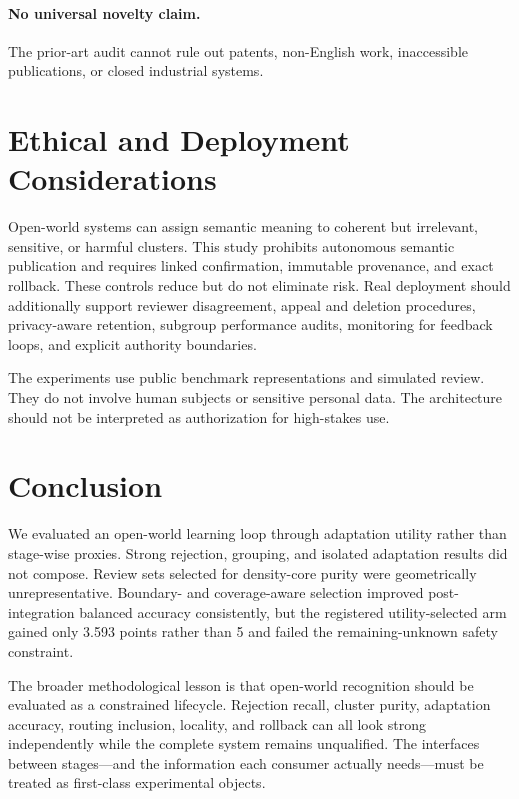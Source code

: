 \documentclass[10pt]{article}
\begin{document}
\paragraph{No universal novelty claim.}
The prior-art audit cannot rule out patents, non-English work, inaccessible
publications, or closed industrial systems.

\section{Ethical and Deployment Considerations}

Open-world systems can assign semantic meaning to coherent but irrelevant,
sensitive, or harmful clusters. This study prohibits autonomous semantic
publication and requires linked confirmation, immutable provenance, and exact
rollback. These controls reduce but do not eliminate risk. Real deployment
should additionally support reviewer disagreement, appeal and deletion
procedures, privacy-aware retention, subgroup performance audits, monitoring
for feedback loops, and explicit authority boundaries.

The experiments use public benchmark representations and simulated review.
They do not involve human subjects or sensitive personal data. The architecture
should not be interpreted as authorization for high-stakes use.

\section{Conclusion}

We evaluated an open-world learning loop through adaptation utility rather than
stage-wise proxies. Strong rejection, grouping, and isolated adaptation results
did not compose. Review sets selected for density-core purity were
geometrically unrepresentative. Boundary- and coverage-aware selection improved
post-integration balanced accuracy consistently, but the registered
utility-selected arm gained only 3.593 points rather than 5 and failed the
remaining-unknown safety constraint.

The broader methodological lesson is that open-world recognition should be
evaluated as a constrained lifecycle. Rejection recall, cluster purity,
adaptation accuracy, routing inclusion, locality, and rollback can all look
strong independently while the complete system remains unqualified. The
interfaces between stages---and the information each consumer actually
needs---must be treated as first-class experimental objects.
\end{document}
